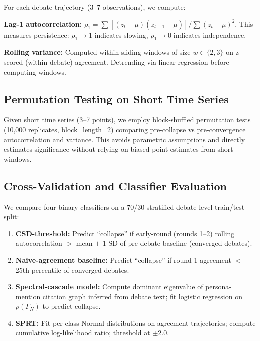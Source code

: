 \documentclass[11pt,letterpaper]{article}
\begin{document}
For each debate trajectory (3--7 observations), we compute:

\textbf{Lag-1 autocorrelation:} $\rho_1 = \sum[(z_t - \mu)(z_{t+1} - \mu)] / \sum(z_t - \mu)^2$. This measures persistence: $\rho_1 \to 1$ indicates slowing, $\rho_1 \to 0$ indicates independence.

\textbf{Rolling variance:} Computed within sliding windows of size $w \in \{2, 3\}$ on z-scored (within-debate) agreement. Detrending via linear regression before computing windows.

\subsection{Permutation Testing on Short Time Series}

Given short time series (3--7 points), we employ block-shuffled permutation tests (10,000 replicates, block\_length=2) comparing pre-collapse vs pre-convergence autocorrelation and variance. This avoids parametric assumptions and directly estimates significance without relying on biased point estimates from short windows.

\subsection{Cross-Validation and Classifier Evaluation}

We compare four binary classifiers on a 70/30 stratified debate-level train/test split:

\begin{enumerate}
\item \textbf{CSD-threshold:} Predict ``collapse'' if early-round (rounds 1--2) rolling autocorrelation $>$ mean $+$ 1 SD of pre-debate baseline (converged debates).

\item \textbf{Naive-agreement baseline:} Predict ``collapse'' if round-1 agreement $<$ 25th percentile of converged debates.

\item \textbf{Spectral-cascade model:} Compute dominant eigenvalue of persona-mention citation graph inferred from debate text; fit logistic regression on $\rho(\Gamma_N)$ to predict collapse.

\item \textbf{SPRT:} Fit per-class Normal distributions on agreement trajectories; compute cumulative log-likelihood ratio; threshold at $\pm 2.0$.
\end{enumerate}
\end{document}
